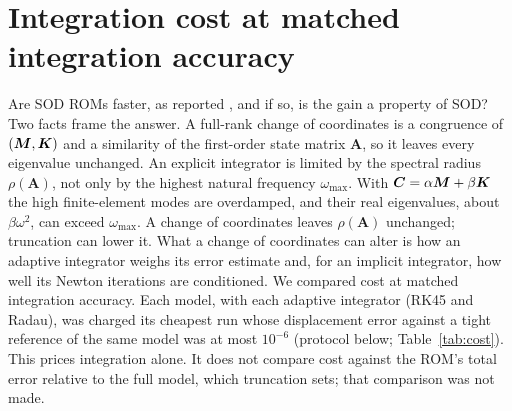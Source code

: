 \documentclass[11pt]{article}
\begin{document}
\section{Integration cost at matched integration accuracy}\label{sec:cost}\label{sec:s-cost}
Are SOD ROMs faster, as reported \citep{Ilbeigi2018}, and if so, is the gain a property of SOD?
Two facts frame the answer.
A full-rank change of coordinates is a congruence of $(\bm{M},\bm{K})$ and a similarity of the first-order state matrix $\bm{A}$, so it leaves every eigenvalue unchanged.
An explicit integrator is limited by the spectral radius $\rho(\bm{A})$, not only by the highest natural frequency $\omega_{\max}$. With $\bm{C}=\alpha\bm{M}+\beta\bm{K}$ the high finite-element modes are overdamped, and their real eigenvalues, about $\beta\omega^2$, can exceed $\omega_{\max}$. A change of coordinates leaves $\rho(\bm{A})$ unchanged; truncation can lower it.
What a change of coordinates can alter is how an adaptive integrator weighs its error estimate and, for an implicit integrator, how well its Newton iterations are conditioned.
We compared cost at matched integration accuracy. Each model, with each adaptive integrator (RK45 and Radau), was charged its cheapest run whose displacement error against a tight reference of the same model was at most $10^{-6}$ (protocol below; Table~\ref{tab:cost}). This prices integration alone. It does not compare cost against the ROM's total error relative to the full model, which truncation sets; that comparison was not made.
\end{document}
